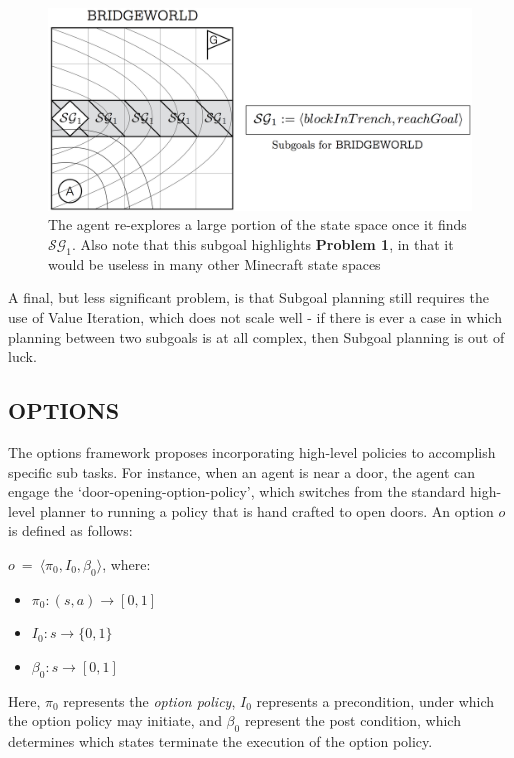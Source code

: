\documentclass[]{article}
\begin{document}
\begin{figure}
\centering
\includegraphics[scale=0.22]{figures/bridgeworld_sg.png}
\caption{The agent re-explores a large portion of the state space once it finds $\mathcal{SG}_1$. Also note that this subgoal highlights {\bf Problem 1}, in that it would be useless in many other Minecraft state spaces}
\end{figure}


A final, but less significant problem, is that Subgoal planning still requires the use of Value Iteration, which does not scale well - if there is ever a case in which planning between two subgoals is at all complex, then Subgoal planning is out of luck.

\subsection{OPTIONS}

The options framework proposes incorporating high-level policies to accomplish specific sub tasks. For instance, when an agent is near a door, the agent can engage the `door-opening-option-policy', which switches from the standard high-level planner to running a policy that is hand crafted to open doors. An option $o$ is defined as follows:

$o\ =\ \langle \pi_0, I_0, \beta_0\rangle$, where:

\begin{itemize}
\item[] $\pi_0 : (s,a) \rightarrow [0,1]$
\item[] $I_0 : s \rightarrow \{0,1\}$
\item[] $\beta_0 : s \rightarrow [0,1]$
\end{itemize}

Here, $\pi_0$ represents the {\it option policy}, $I_0$ represents a precondition, under which the option policy may initiate, and $\beta_0$ represent the post condition, which determines which states terminate the execution of the option policy.
\end{document}
